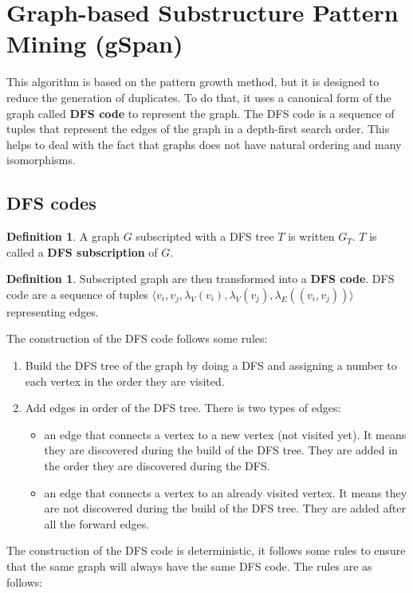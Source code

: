 \documentclass[12pt, openany]{report}
\theoremstyle{definition}
\newtheorem{definition}[thm]{Definition}
\begin{document}
\section{Graph-based Substructure Pattern Mining (gSpan)}
This algorithm is based on the pattern growth method, but it is designed to reduce the generation of duplicates. To do that, it uses a canonical form of the graph called \textbf{DFS code} to represent the graph. The DFS code is a sequence of tuples that represent the edges of the graph in a depth-first search order. This helps to deal with the fact that graphs does not have natural ordering and many isomorphisms.\\
\subsection{DFS codes}
\begin{definition}
    A graph $G$ subscripted with a DFS tree $T$ is written $G_T$. $T$ is called a \textbf{DFS subscription} of $G$. 
\end{definition}
\begin{definition}
    Subscripted graph are then transformed into a \textbf{DFS code}. DFS code are a sequence of tuples $\langle v_i , v_j , \lambda_V (v_i ), \lambda_V (v_j ), \lambda_E ((v_i , v_j ))\rangle$ representing edges.
\end{definition}
The construction of the DFS code follows some rules:
\begin{enumerate}
    \item Build the DFS tree of the graph by doing a DFS and assigning a number to each vertex in the order they are visited. 
    \item Add edges in order of the DFS tree. There is two types of edges:
    \begin{itemize}
        \item an edge that connects a vertex to a new vertex (not visited yet). It means they are discovered during the build of the DFS tree. They are added in the order they are discovered during the DFS.
        \item an edge that connects a vertex to an already visited vertex. It means they are not discovered during the build of the DFS tree. They are added after all the forward edges. 
    \end{itemize}
\end{enumerate}
The construction of the DFS code is deterministic, it follows some rules to ensure that the same graph will always have the same DFS code. The rules are as follows:
\end{document}
